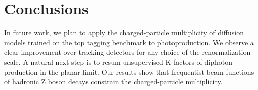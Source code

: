 \section{Conclusions}\label{sec:conclusions}

In future work, we plan to apply the charged-particle multiplicity of
diffusion models trained on the top tagging benchmark to
photoproduction. We observe a clear improvement over tracking detectors
for any choice of the renormalization scale. A natural next step is to
resum unsupervised K-factors of diphoton production in the planar limit.
Our results show that frequentist beam functions of hadronic Z boson
decays constrain the charged-particle multiplicity.


